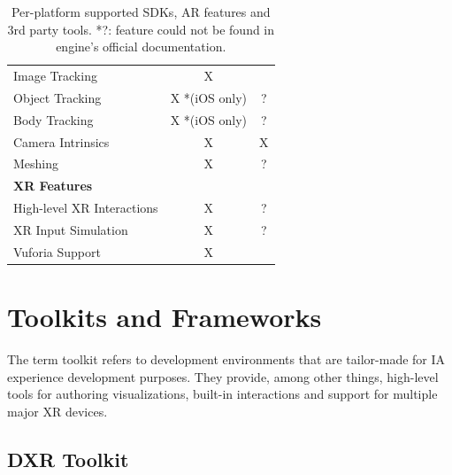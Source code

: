 \documentclass{vgtc}                          %
\begin{document}
\begin{table}
\begin{tabular}{l c c}
		Image Tracking                & X                                     &                          \\
		Object Tracking               & X *(iOS only)                         & ?                        \\
		Body Tracking                 & X *(iOS only)                         & ?                        \\
		Camera Intrinsics             & X                                     & X                        \\
		Meshing                       & X                                     & ?                        \\
		\midrule
		\textbf{XR Features}          &                                       &                          \\
		\midrule
		High-level XR Interactions    & X                                     & ?                        \\
		XR Input Simulation           & X                                     & ?                        \\
		\midrule
		Vuforia Support               & X                                     &                          \\
		\bottomrule
	\end{tabular}


	\medskip

	\caption{Per-platform supported SDKs, AR features and 3rd party tools. *?:
		feature could not be found in engine's official documentation.}
	\label{table:1}
\end{table}

\section{Toolkits and Frameworks}

The term toolkit refers to development environments that are tailor-made for
IA experience development purposes. They provide, among other things,
high-level tools for authoring visualizations, built-in interactions and
support for multiple major XR devices.

\subsection{DXR Toolkit}
\end{document}
